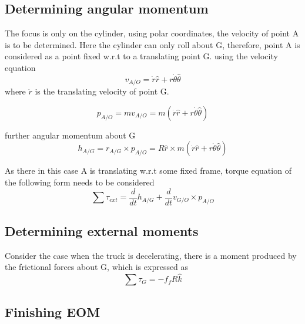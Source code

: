 \subsection{Determining angular momentum}

The focus is only on the cylinder, using polar coordinates, the velocity of point A is to be determined. Here the cylinder can only roll about G, therefore, point A is considered as a point fixed w.r.t to a translating point G. using the velocity equation
\begin{equation}
	v_{A/O} = \dot{r}\hat{r} + r \dot{\theta} \hat{\theta}
\end{equation}
where $\dot{r}$ is the translating velocity of point G. 

\begin{equation}
	p_{A/O} = m v_{A/O} = m \left(\dot{r}\hat{r} + r \dot{\theta} \hat{\theta}\right)
\end{equation}

further angular momentum about G
\begin{equation}
	h_{A/G} = r_{A/G} \times p_{A/O} = R \hat{r} \times  m \left(\dot{r}\hat{r} + r \dot{\theta} \hat{\theta}\right)
\end{equation}

As there in this case A is translating w.r.t some fixed frame, torque equation of the following form needs to be considered
\begin{equation}
\sum \tau_{ext} = \frac{d}{dt}h_{A/G} + \frac{d}{dt}v_{G/O} \times p_{A/O}
\end{equation}

\subsection{Determining external moments}

Consider the case when the truck is decelerating, there is a moment produced by the frictional forces about G, which is expressed as
\begin{equation}
	\sum \tau_{G} = -f_{f}R \hat{k}
\end{equation}

\subsection{Finishing EOM}

